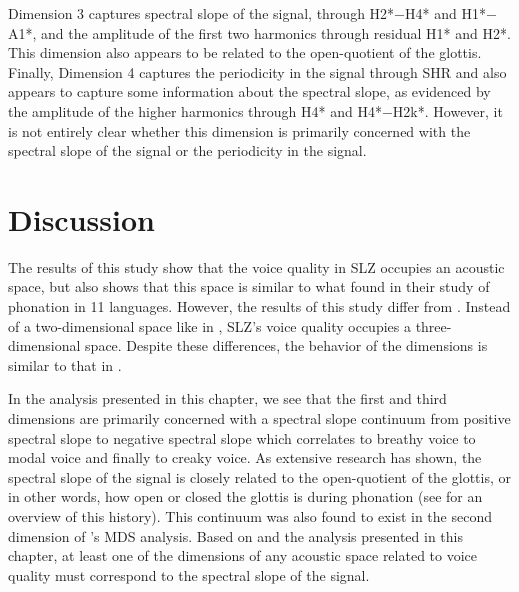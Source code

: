 Dimension 3 captures spectral slope of the signal, through H2*$-$H4* and H1*$-$A1*, and the amplitude of the first two harmonics through residual H1* and H2*. This dimension also appears to be related to the open-quotient of the glottis. Finally, Dimension 4 captures the periodicity in the signal through SHR and also appears to capture some information about the spectral slope, as evidenced by the amplitude of the higher harmonics through H4* and H4*$-$H2k*. However, it is not entirely clear whether this dimension is primarily concerned with the spectral slope of the signal or the periodicity in the signal.

\section{Discussion} \label{sec:acousticlandscape:discussion}

The results of this study show that the voice quality in SLZ occupies an acoustic space, but also shows that this space is similar to what \citet{keatingCrosslanguageAcousticSpace2023} found in their study of phonation in 11 languages. However, the results of this study differ from \citet{keatingCrosslanguageAcousticSpace2023}. Instead of a two-dimensional space like in \citet{keatingCrosslanguageAcousticSpace2023}, SLZ's voice quality occupies a three-dimensional space. Despite these differences, the behavior of the dimensions is similar to that in \citet{keatingCrosslanguageAcousticSpace2023}. 

In the analysis presented in this chapter, we see that the first and third dimensions are primarily concerned with a spectral slope continuum from positive spectral slope to negative spectral slope which correlates to breathy voice to modal voice and finally to creaky voice. As extensive research has shown, the spectral slope of the signal is closely related to the open-quotient of the glottis, or in other words, how open or closed the glottis is during phonation (see \citet{garellekTheoreticalAchievementsPhonetics2022} for an overview of this history). This continuum was also found to exist in the second dimension of \citeauthor{keatingCrosslanguageAcousticSpace2023}'s \citeyear{keatingCrosslanguageAcousticSpace2023} MDS analysis. Based on \citet{keatingCrosslanguageAcousticSpace2023} and the analysis presented in this chapter, at least one of the dimensions of any acoustic space related to voice quality must correspond to the spectral slope of the signal. 

